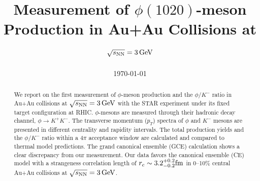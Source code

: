 \documentclass[%
 reprint,	
showpacs,
 amsmath,amssymb,
 aps,
 prc,
]{revtex4-1}
\begin{document}

\title{Measurement of $\phi(1020)$-meson Production in Au+Au Collisions at ${\sqrt{s_{\rm NN}} = \rm{3\,GeV}}$}%


\noaffiliation

\date{\today}%

\begin{abstract}


We report on the first measurement of $\phi$-meson production and the $\phi/K^-$ ratio in Au+Au collisions at ${\sqrt{s_{\rm NN}} = \rm{3\,GeV}}$ with the STAR experiment under its fixed target configuration at RHIC. $\phi$-mesons are measured through their hadronic decay channel, $\phi\rightarrow K^+K^-$. The transverse momentum ($p_T$) spectra of $\phi$ and $K^-$ mesons are presented in different centrality and rapidity intervals. The total production yields and the $\phi/K^-$ ratio within a $4\pi$ acceptance window are calculated and compared to thermal model predictions. The grand canonical ensemble (GCE) calculation shows a clear discrepancy from our measurement. Our data favors the canonical ensemble (CE) model with a strangeness correlation length of $r_c   \sim 3.2_{-0.2}^{+0.2} \rm{fm}$ in 0--10\% central Au+Au collisions at ${\sqrt{s_{\rm NN}} = \rm{3\,GeV}}$.


\end{abstract}
\end{document}
